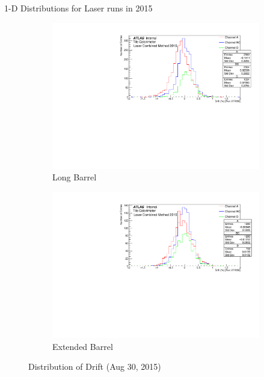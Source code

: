 \documentclass{beamer}
\begin{document}
\begin{frame}{1-D Distributions for Laser runs in 2015}
\begin{figure}[H]
\centering
\begin{subfigure} [t] {0.49\textwidth}
\includegraphics[width=\textwidth]{LB2.pdf}
\caption{Long Barrel}
\end{subfigure}
\begin{subfigure} [t] {0.49\textwidth}
\includegraphics[width=\textwidth]{EB2.pdf}
\caption{Extended Barrel}
\end{subfigure}
\caption{Distribution of Drift (Aug 30, 2015)}
\end{figure}
\end{frame}
\end{document}
